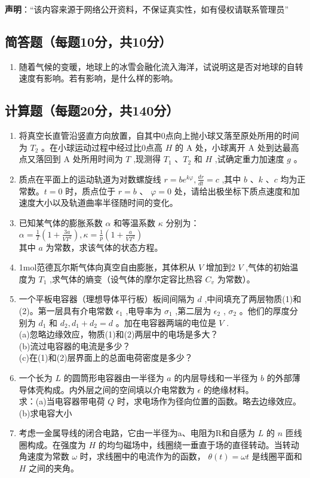 
\textbf{声明}：“该内容来源于网络公开资料，不保证真实性，如有侵权请联系管理员”

\subsection{简答题（每题10分，共10分）}
\begin{enumerate}
\item 随着气候的变暖，地球上的冰雪会融化流入海洋，试说明这是否对地球的自转速度有影响。若有影响，是什么样的影响。
\end{enumerate}
\subsection{计算题（每题20分，共140分）}
\begin{enumerate}
\item 将真空长直管沿竖直方向放置，自其中0点向上抛小球又落至原处所用的时间为 $T_2$ 。在小球运动过程中经过比0点高 $H$ 的 $\mathrm A$ 处，小球离开 $\mathrm A$ 处到达最高点又落回到 $\mathrm A$ 处所用时间为 $T$ ,现测得 $T_1$ 、$T_2$ 和 $H$ ,试确定重力加速度 $g$ 。
\item 质点在平面上的运动轨道为对数螺旋线 $r=be^{k\varphi},\frac{dr}{dt}=c$ ,其中 $b$ 、$k$ 、$c$ 均为正常数。$t=0$ 时，质点位于 $r=b$ 、 $\varphi=0$ 处，请给出极坐标下质点速度和加速度大小以及轨道曲率半径随时间的变化。
\item 已知某气体的膨胀系数 $\alpha$ 和等温系数 $\kappa$ 分别为：\\
 $\alpha=\frac{1}{T}(1+\frac{3a}{VT^2}),\kappa=\frac{1}{p}(1+\frac{a}{VT^2})$ \\
其中 $a$ 为常数，求该气体的状态方程。

\item 1mol范德瓦尔斯气体向真空自由膨胀，其体积从 $V$ 增加到2 $V$ ,气体的初始温度为 $T_1$ ,求气体的熵变（设气体的摩尔定容比热容 $C_v$ 为常数）。
\item 一个平板电容器（理想导体平行板）板间间隔为 $d$ ,中间填充了两层物质(1)和(2)。第一层具有介电常数 $\epsilon_1$ ,电导率为 $\sigma_1$ ,第二层为 $\epsilon_2$ , $\sigma_2$ 。他们的厚度分别为 $d_1$ 和 $d_2,d_1+d_2=d$ 。加在电容器两端的电位是 $V$ .\\
(a)忽略边缘效应，物质(1)和(2)两层中的电场是多大？\\
(b)流过电容器的电流是多少？\\
(c)在(1)和(2)层界面上的总面电荷密度是多少？\\
\item 一个长为 $L$ 的圆筒形电容器由一半径为 $a$ 的内层导线和一半径为 $b$ 的外部薄导体壳构成。内外层之间的空间填以介电常数为 $\epsilon$ 的绝缘材料。\\
求：(a)当电容器带电荷 $Q$ 时，求电场作为径向位置的函数。略去边缘效应。\\
(b)求电容大小
\item 考虑一金属导线的闭合电路，它由一半径为a、电阻为R和自感为 $L$ 的 $n$ 匝线圈构成。在强度为 $H$ 的均匀磁场中，线圈绕一垂直于场的直径转动。当转动角速度为常数 $\omega$ 时，求线圈中的电流作为的函数， $\theta (t)=\omega t$ 是线圈平面和 $H$ 之间的夹角。

\end{enumerate}
